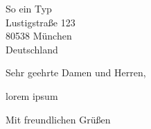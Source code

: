 \documentclass
[
    fontsize=12pt, %
    version=last,  %
    parskip=full   %
]
{scrlttr2}
\begin{document}


\begin{letter}


{%
    So ein Typ\\
    Lustigstraße 123\\
    80538 München\\
    Deutschland
}


\opening{Sehr geehrte Damen und Herren,}

lorem ipsum


\closing{Mit freundlichen Grüßen}




\end{letter}
\end{document}
